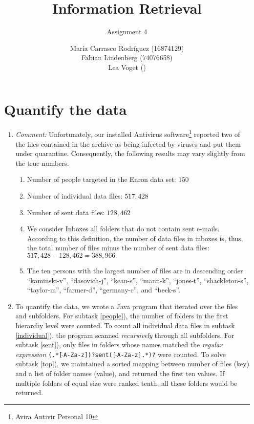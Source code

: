 \documentclass[a4paper,11pt,oneside]{book}
\title{Information Retrieval }
\subtitle{Assignment 4}
\author{ María Carrasco Rodríguez (16874129) \\
		Fabian Lindenberg (74076658) \\
		Lea Voget ()}
\begin{document}
\kostspieligmaketitle


\setcounter{chapter}{1}
\chapter{Quantify the data}

\begin{enumerate}
	\item \emph{Comment:} Unfortunately, our installed Antivirus software\footnote{Avira Antivir Personal 10} reported two of the files contained in the archive as being infected by viruses and put them under quarantine. Consequently, the following results may vary slightly from the true numbers.
		\begin{enumerate}
			\renewcommand{\labelenumii}{\alph{enumii})}
			\item \label{people} Number of people targeted in the Enron data set: $150$
			\item \label{individual} Number of individual data files: $517,428$
			\item \label{sent}Number of sent data files: $128,462$
			\item We consider Inboxes all folders that do not contain sent e-mails. According to this definition, the number of data files in inboxes is, thus, the total number of files minus the number of sent data files: $517,428 - 128,462 = 388,966$
			\item \label{top} The ten persons with the largest number of files are in descending order ``kaminski-v'', ``dasovich-j'', ``kean-s'', ``mann-k'', ``jones-t'', ``shackleton-s'', ``taylor-m'', ``farmer-d'', ``germany-c'', and ``beck-s''.
		\end{enumerate}
	\item To quantify the data, we wrote a Java program that iterated over the files and subfolders. For subtask \ref{people}), the number of folders in the first hierarchy level were counted. To count all individual data files in subtask \ref{individual}), the program scanned \emph{recursively} through all subfolders. For subtask \ref{sent}), only files in folders whose names matched the \emph{regular expression} \texttt{(.*[$\,\hat{}$A-Za-z])?sent([$\,\hat{}$A-Za-z].*)?} were counted. To solve subtask \ref{top}), we maintained a sorted mapping between number of files (key) and a list of folder names (value), and returned the first ten values. If multiple folders of equal size were ranked tenth, all these folders would be returned.
\end{enumerate}
\end{document}
